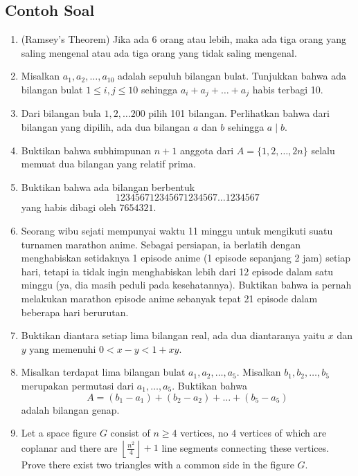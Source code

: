 \documentclass[12pt]{scrartcl}
\begin{document}
\subsection{Contoh Soal}
\begin{enumerate}
    \item (Ramsey's Theorem) Jika ada 6 orang atau lebih, maka ada tiga orang yang saling mengenal atau ada tiga orang yang tidak saling mengenal.

    \item Misalkan $a_1, a_2, \dots, a_{10}$ adalah sepuluh bilangan bulat. Tunjukkan bahwa ada bilangan bulat $1 \le i,j \le 10$ sehingga $a_i+a_j+\dots+a_j$ habis terbagi 10.

    \item Dari bilangan bula $1,2,\dots 200$ pilih 101 bilangan. Perlihatkan bahwa dari bilangan yang dipilih, ada dua bilangan $a$ dan $b$ sehingga $a \mid b$.

    \item Buktikan bahwa subhimpunan $n+1$ anggota dari $A=\{1,2,\dots, 2n\}$ selalu memuat dua bilangan yang relatif prima.

    \item Buktikan bahwa ada bilangan berbentuk $$123456712345671234567\dots1234567$$
    yang habis dibagi oleh $7654321$.

    \item Seorang wibu sejati mempunyai waktu 11 minggu untuk mengikuti suatu turnamen marathon anime. Sebagai persiapan, ia berlatih dengan menghabiskan setidaknya 1 episode anime (1 episode sepanjang 2 jam) setiap hari, tetapi ia tidak ingin menghabiskan lebih dari 12 episode dalam satu minggu (ya, dia masih peduli pada kesehatannya). Buktikan bahwa ia pernah melakukan marathon episode anime sebanyak tepat 21 episode dalam beberapa hari berurutan.

    \item Buktikan diantara setiap lima bilangan real, ada dua diantaranya yaitu $x$ dan $y$ yang memenuhi $0 < x-y < 1+xy$.

    \item Misalkan terdapat lima bilangan bulat $a_1, a_2, \dots, a_5$. Misalkan $b_1,b_2,\dots,b_5$ merupakan permutasi dari $a_1,\dots,a_5$. Buktikan bahwa 
    $$A=(b_1-a_1)+(b_2-a_2)+\dots+(b_5-a_5)$$ adalah bilangan genap.

    \item Let a space figure $G$ consist of $n \ge 4$ vertices, no $4$ vertices of which are coplanar and there are $\left\lfloor \frac{n^2}{4} \right\rfloor + 1$ line segments connecting these vertices. Prove there exist two triangles with a common side in the figure $G$.
    

\end{enumerate}
\end{document}
